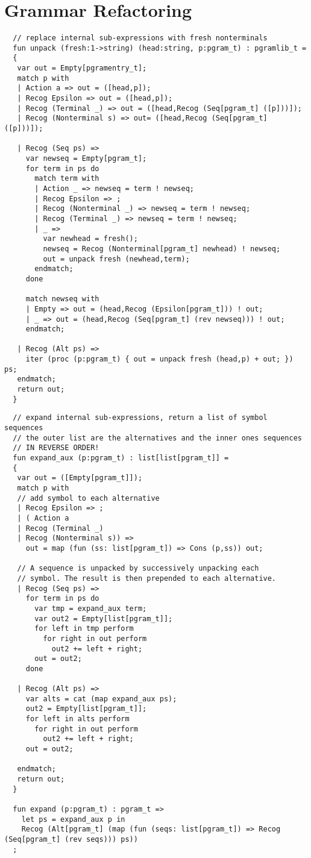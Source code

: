 \documentclass[oneside]{book}
\begin{document}
\chapter{Grammar Refactoring}

\begin{verbatim}
  // replace internal sub-expressions with fresh nonterminals
  fun unpack (fresh:1->string) (head:string, p:pgram_t) : pgramlib_t =
  {
   var out = Empty[pgramentry_t];
   match p with
   | Action a => out = ([head,p]); 
   | Recog Epsilon => out = ([head,p]);
   | Recog (Terminal _) => out = ([head,Recog (Seq[pgram_t] ([p]))]);
   | Recog (Nonterminal s) => out= ([head,Recog (Seq[pgram_t] ([p]))]);

   | Recog (Seq ps) =>
     var newseq = Empty[pgram_t];
     for term in ps do
       match term with
       | Action _ => newseq = term ! newseq;
       | Recog Epsilon => ;
       | Recog (Nonterminal _) => newseq = term ! newseq;
       | Recog (Terminal _) => newseq = term ! newseq;
       | _ =>
         var newhead = fresh();
         newseq = Recog (Nonterminal[pgram_t] newhead) ! newseq;
         out = unpack fresh (newhead,term);
       endmatch;
     done

     match newseq with 
     | Empty => out = (head,Recog (Epsilon[pgram_t])) ! out;
     | _ => out = (head,Recog (Seq[pgram_t] (rev newseq))) ! out;
     endmatch;

   | Recog (Alt ps) =>
     iter (proc (p:pgram_t) { out = unpack fresh (head,p) + out; }) ps;
   endmatch;
   return out;
  }
\end{verbatim}


\begin{verbatim}
  // expand internal sub-expressions, return a list of symbol sequences
  // the outer list are the alternatives and the inner ones sequences
  // IN REVERSE ORDER! 
  fun expand_aux (p:pgram_t) : list[list[pgram_t]] =
  {
   var out = ([Empty[pgram_t]]);
   match p with
   // add symbol to each alternative
   | Recog Epsilon => ;
   | ( Action a  
   | Recog (Terminal _) 
   | Recog (Nonterminal s)) => 
     out = map (fun (ss: list[pgram_t]) => Cons (p,ss)) out; 

   // A sequence is unpacked by successively unpacking each
   // symbol. The result is then prepended to each alternative.
   | Recog (Seq ps) =>
     for term in ps do
       var tmp = expand_aux term;
       var out2 = Empty[list[pgram_t]];
       for left in tmp perform 
         for right in out perform
           out2 += left + right;
       out = out2;
     done
 
   | Recog (Alt ps) =>
     var alts = cat (map expand_aux ps);
     out2 = Empty[list[pgram_t]];
     for left in alts perform
       for right in out perform
         out2 += left + right;
     out = out2;

   endmatch;
   return out;
  }

  fun expand (p:pgram_t) : pgram_t =>
    let ps = expand_aux p in
    Recog (Alt[pgram_t] (map (fun (seqs: list[pgram_t]) => Recog (Seq[pgram_t] (rev seqs))) ps))
  ;
\end{verbatim}
\end{document}

